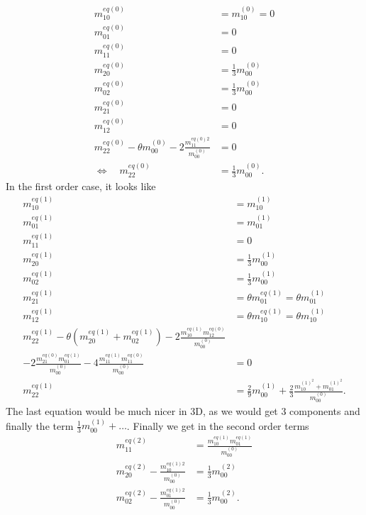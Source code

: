 \begin{equation}
  \begin{aligned}
    m_{10}^{eq(0)} & = m_{10}^{(0)} = 0 \\
    m_{01}^{eq(0)} & = 0 \\
    m_{11}^{eq(0)} & = 0 \\
    m_{20}^{eq(0)} & = \frac{1}{3} m_{00}^{(0)} \\
    m_{02}^{eq(0)} & = \frac{1}{3} m_{00}^{(0)} \\
    m_{21}^{eq(0)} & = 0 \\
    m_{12}^{eq(0)} & = 0 \\
    m_{22}^{eq(0)} - \theta m_{00}^{(0)} - 2\frac{ m_{11}^{eq(0)2}}{m_{00}^{(0)}} & = 0 \\
    \Leftrightarrow\quad m_{22}^{eq(0)} &= \frac{1}{3} m_{00}^{(0)}.
  \end{aligned}
\end{equation}
In the first order case, it looks like
\begin{equation}
  \begin{aligned}
    m_{10}^{eq(1)} & = m_{10}^{(1)} \\
    m_{01}^{eq(1)} & = m_{01}^{(1)} \\
    m_{11}^{eq(1)} & = 0 \\
    m_{20}^{eq(1)} & = \frac{1}{3} m_{00}^{(1)} \\
    m_{02}^{eq(1)} & = \frac{1}{3} m_{00}^{(1)} \\
    m_{21}^{eq(1)} & = \theta m_{01}^{eq(1)} = \theta m_{01}^{(1)}\\
    m_{12}^{eq(1)} & = \theta m_{10}^{eq(1)} = \theta m_{10}^{(1)} \\
    m_{22}^{eq(1)} - \theta (m_{20}^{eq(1)} + m_{02}^{eq(1)})
    - 2\frac{ m_{10}^{eq(1)} m_{12}^{eq(0)} }{m_{00}^{(0)}}&\\
    - 2\frac{ m_{21}^{eq(0)} m_{01}^{eq(1)} }{m_{00}^{(0)}}
    - 4\frac{ m_{11}^{eq(1)} m_{11}^{eq(0)} }{m_{00}^{(0)}}&=0\\
    m_{22}^{eq(1)} &= \frac{2}{9} m_{00}^{(1)}
    + \frac{2}{3}\frac{  m_{10}^{{(1)}^2} +m_{01}^{{(1)}^2} }{m_{00}^{(0)}}.
  \end{aligned}
\end{equation}
The last equation would be much nicer in 3D, as we would get 3 components and finally the term $\frac{1}{3} m_{00}^{(1)} + \ldots$.
Finally we get in the second order terms
\begin{equation}
  \begin{aligned}
    m_{11}^{eq(2)} & = \frac{ m_{10}^{eq(1)}m_{01}^{eq(1)}}{m_{00}^{(0)}} \\
    m_{20}^{eq(2)} - \frac{ m_{10}^{eq(1)2}}{m_{00}^{(0)}} & = \frac{1}{3} m_{00}^{(2)} \\
    m_{02}^{eq(2)} - \frac{ m_{01}^{eq(1)2}}{m_{00}^{(0)}} & = \frac{1}{3} m_{00}^{(2)}.
  \end{aligned}
\end{equation}
